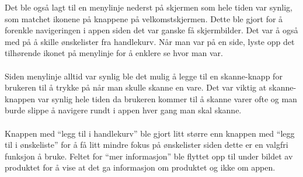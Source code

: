 \noindent Det ble også lagt til en menylinje nederst på skjermen som hele tiden var synlig, som matchet ikonene på knappene på velkomstskjermen. Dette ble gjort for å forenkle navigeringen i appen siden det var ganske få skjermbilder. Det var å også med på å skille ønskelister fra handlekurv. Når man var på en side, lyste opp det tilhørende ikonet på menylinje for å enklere se hvor man var. 
\\\\
Siden menylinje alltid var synlig ble det mulig å legge til en skanne-knapp for brukeren til å trykke på når man skulle skanne en vare. Det var viktig at skanne-knappen var synlig hele tiden da brukeren kommer til å skanne varer ofte og man burde slippe å navigere rundt i appen hver gang man skal skanne. 
\\\\
Knappen med “legg til i handlekurv” ble gjort litt større enn knappen med “legg til i ønskeliste” for å få litt mindre fokus på ønskelister siden dette er en valgfri funksjon å bruke. Feltet for “mer informasjon” ble flyttet opp til under bildet av produktet for å vise at det ga informasjon om produktet og ikke om appen. 

